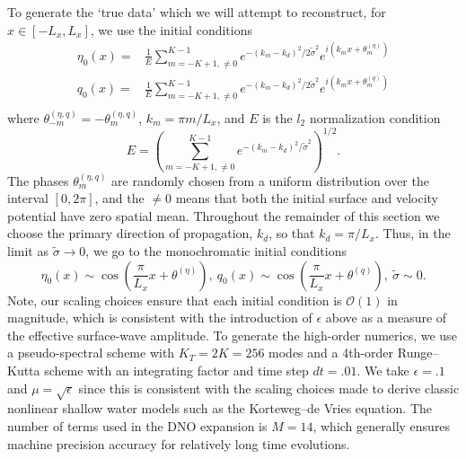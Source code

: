 To generate the `true data' which we will attempt to reconstruct, for $x\in[-L_{x},L_{x}]$, we use the initial conditions 
\begin{align*}
	\eta_{0}(x) = & \frac{1}{E}\sum_{m=-K+1,\neq0}^{K-1} e^{-\left(k_{m}-k_{d}\right)^{2}/2\tilde{\sigma}^{2}}e^{i(k_{m}x+\theta^{(\eta)}_{m})}\\
	q_{0}(x) = & \frac{1}{E}\sum_{m=-K+1,\neq0}^{K-1} e^{-\left(k_{m}-k_{d}\right)^{2}/2\tilde{\sigma}^{2}}e^{i(k_{m}x+\theta^{(q)}_{m})}\\
\end{align*}
where $\theta^{(\eta,q)}_{-m} = -\theta^{(\eta,q)}_{m}$, $k_{m}=\pi m/L_{x}$, and $E$ is the $l_{2}$ normalization condition
\[
E = \left(\sum_{m=-K+1,\neq0}^{K-1} e^{-\left(k_{m}-k_{d}\right)^{2}/\tilde{\sigma}^{2}}\right)^{1/2}.
\]
The phases $\theta^{(\eta,q)}_{m}$ are randomly chosen from a uniform distribution over the interval $[0,2\pi]$, and the $\neq0$ means that both the initial surface and velocity potential have zero spatial mean. Throughout the remainder of this section we choose the primary direction of propagation, $k_{d}$, so that $k_{d} = \pi/L_{x}$.  Thus, in the limit as $\tilde{\sigma}\rightarrow 0$, we go to the monochromatic initial conditions
\[
\eta_{0}(x) \sim \cos\left(\frac{\pi}{L_{x}}x +\theta^{(\eta)}\right), ~ q_{0}(x) \sim \cos\left(\frac{\pi}{L_{x}}x +\theta^{(q)}\right), ~ \tilde{\sigma} \sim 0.
\]
Note, our scaling choices ensure that each initial condition is $\mathcal{O}(1)$ in magnitude, which is consistent with the introduction of $\epsilon$ above as a measure of the effective surface-wave amplitude.  To generate the high-order numerics, we use a pseudo-spectral scheme with $K_{T}=2K=256$ modes and a 4th-order Runge--Kutta scheme with an integrating factor and time step $dt=.01$. We take $\epsilon=.1$ and $\mu=\sqrt{\epsilon}$ since this is consistent with the scaling choices made to derive classic nonlinear shallow water models such as the Korteweg--de Vries equation.  The number of terms used in the DNO expansion is $M=14$, which generally ensures machine precision accuracy for relatively long time evolutions.  


